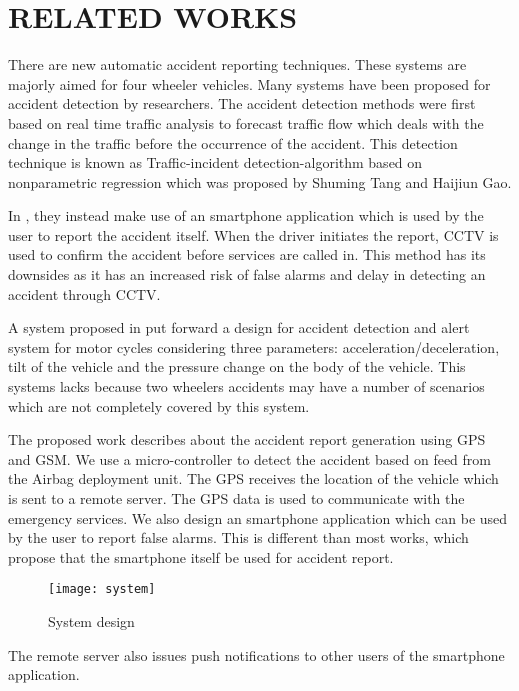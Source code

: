 \chapter{RELATED WORKS} 
There are new automatic accident reporting techniques. These systems are majorly aimed for four wheeler vehicles. Many systems have been proposed for accident detection by researchers. The accident detection methods were first based on real time traffic analysis to forecast traffic flow which deals with the change in the traffic before the occurrence of the accident. This detection technique is known as Traffic-incident detection-algorithm based on nonparametric regression which was proposed by Shuming Tang and Haijiun Gao.

In \cite{chuan}, they instead make use of an smartphone application which is used by the user to report the accident itself. When the driver initiates the report, CCTV is used to confirm the accident before services are called in. This method has its downsides as it has an increased risk of false alarms and delay in detecting an accident through CCTV.

A system proposed in \cite{bin} put forward a design for accident detection and alert system for motor cycles considering three parameters: acceleration/deceleration, tilt of the vehicle and the pressure change on the body of the vehicle. This systems lacks because two wheelers accidents may have a number of scenarios which are not completely covered by this system.

The proposed work describes about the accident report generation using GPS and GSM. We use a micro-controller to detect the accident based on feed from the Airbag deployment unit. The GPS receives the location of the vehicle which is sent to a remote server. The GPS data is used to communicate with the emergency services. We also design an smartphone application which can be used by the user to report false alarms. This is different than most works, which propose that the smartphone itself be used for accident report. 

\begin{figure}[h!]
	\centering
	\texttt{[image: system]}
	\caption{System design}
	\label{fig:system}
\end{figure}

The remote server also issues push notifications to other users of the smartphone application.